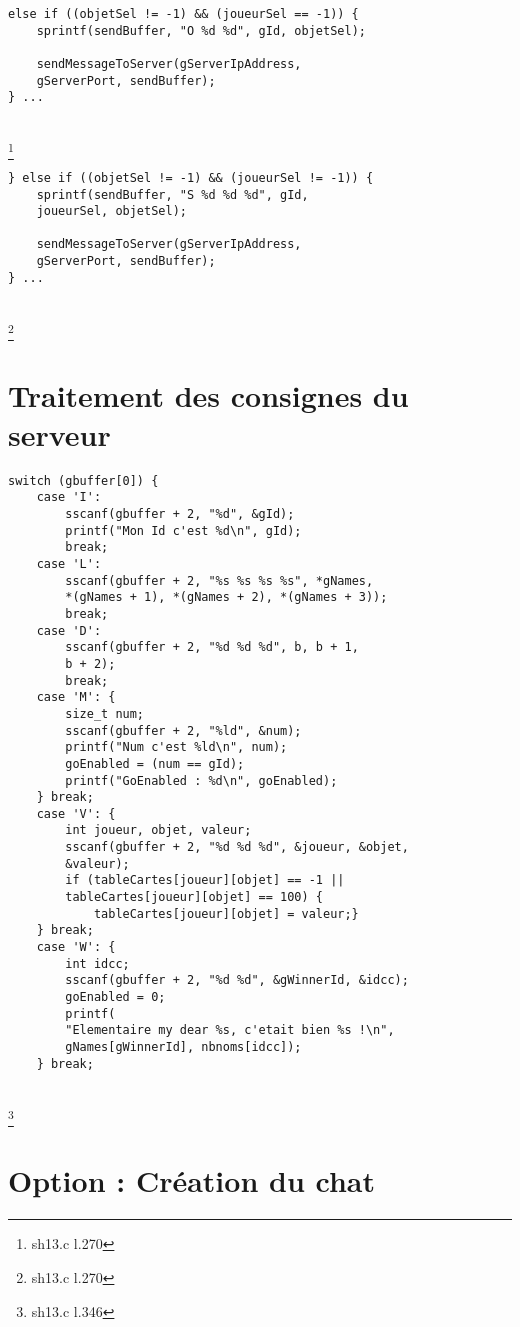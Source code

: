 \documentclass[11pt]{article}
\newenvironment{DDbox}[1]{
\begin{lrbox}{\BBbox}\begin{minipage}{\linewidth}}
{\end{minipage}\end{lrbox}\noindent\colorbox{Zgris}{\usebox{\BBbox}} \\
[.5cm]}
\begin{document}
\begin{DDbox}{\linewidth}
\begin{Verbatim}
else if ((objetSel != -1) && (joueurSel == -1)) {
	sprintf(sendBuffer, "O %d %d", gId, objetSel);

	sendMessageToServer(gServerIpAddress,
	gServerPort, sendBuffer);
} ...
\end{Verbatim}
\end{DDbox}
\footnote{sh13.c l.270}


\begin{DDbox}{\linewidth}
\begin{Verbatim}
} else if ((objetSel != -1) && (joueurSel != -1)) {
	sprintf(sendBuffer, "S %d %d %d", gId,
	joueurSel, objetSel);

	sendMessageToServer(gServerIpAddress,
	gServerPort, sendBuffer);
} ...
\end{Verbatim}
\end{DDbox}
\footnote{sh13.c l.270}

\section{Traitement des consignes du serveur}

\begin{DDbox}{\linewidth}
\begin{Verbatim}
switch (gbuffer[0]) {
	case 'I':
		sscanf(gbuffer + 2, "%d", &gId);
		printf("Mon Id c'est %d\n", gId);
		break;
	case 'L':
		sscanf(gbuffer + 2, "%s %s %s %s", *gNames,
		*(gNames + 1), *(gNames + 2), *(gNames + 3));
		break;
	case 'D':
		sscanf(gbuffer + 2, "%d %d %d", b, b + 1,
		b + 2);
		break;
	case 'M': {
		size_t num;
		sscanf(gbuffer + 2, "%ld", &num);
		printf("Num c'est %ld\n", num);
		goEnabled = (num == gId);
		printf("GoEnabled : %d\n", goEnabled);
	} break;
	case 'V': {
		int joueur, objet, valeur;
		sscanf(gbuffer + 2, "%d %d %d", &joueur, &objet,
		&valeur);
		if (tableCartes[joueur][objet] == -1 ||
		tableCartes[joueur][objet] == 100) {
			tableCartes[joueur][objet] = valeur;}
	} break;
	case 'W': {
		int idcc;
		sscanf(gbuffer + 2, "%d %d", &gWinnerId, &idcc);
		goEnabled = 0;
		printf(
		"Elementaire my dear %s, c'etait bien %s !\n",
		gNames[gWinnerId], nbnoms[idcc]);
	} break;
\end{Verbatim}
\end{DDbox}
\footnote{sh13.c l.346}

\section{Option : Création du chat}
\end{document}
